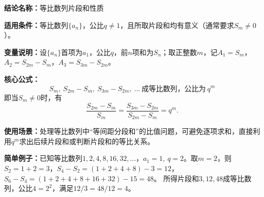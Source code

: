 \textbf{结论名称：}等比数列片段和性质

\textbf{适用条件：}等比数列$\{a_n\}$，公比$q\neq 1$，且所取片段和均有意义（通常要求$S_m\neq 0$）。

\textbf{变量说明：}设$\{a_n\}$首项为$a_1$，公比$q$，前$n$项和为$S_n$；取正整数$m$，记$A_1=S_m$，$A_2=S_{2m}-S_m$，$A_3=S_{3m}-S_{2m}$。

\textbf{核心公式：}
\[
\boxed{S_m,\ S_{2m}-S_m,\ S_{3m}-S_{2m},\ \ldots\ \text{成等比数列，公比为}\ q^m}
\]
即当$S_m\neq0$时，有
\[
\frac{S_{2m}-S_m}{S_m}= \frac{S_{3m}-S_{2m}}{S_{2m}-S_m}=q^m.
\]

\textbf{使用场景：}处理等比数列中“等间距分段和”的比值问题，可避免逐项求和，直接利用$q^m$求出后续片段和或判断片段和的等比关系。

\textbf{简单例子：}已知等比数列$1,2,4,8,16,32,\dots$，$a_1=1,\ q=2$。取$m=2$，则
$S_2=1+2=3$，$S_4-S_2=(1+2+4+8)-3=12$，$S_6-S_4=(1+2+4+8+16+32)-15=48$。
所得片段和$3,12,48$成等比数列，公比$4=2^2$，满足$12/3=48/12=4$。